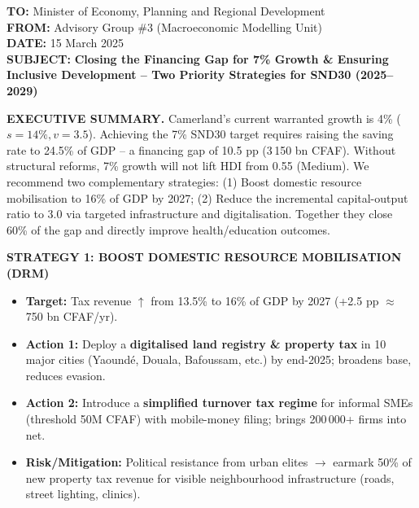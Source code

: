 \documentclass[11pt]{article}
\begin{document}
\begin{exemplebox}
\begin{center}
\end{center}

\vspace{0.5cm}
\noindent\textbf{TO:} Minister of Economy, Planning and Regional Development\\
\textbf{FROM:} Advisory Group \#3 (Macroeconomic Modelling Unit)\\
\textbf{DATE:} 15 March 2025\\
\textbf{SUBJECT:} \textbf{Closing the Financing Gap for 7\% Growth \& Ensuring Inclusive Development -- Two Priority Strategies for SND30 (2025--2029)}

\vspace{0.3cm}
\noindent\textbf{EXECUTIVE SUMMARY.} Camerland's current warranted growth is 4\% ($s=14\%, v=3.5$). Achieving the 7\% SND30 target requires raising the saving rate to 24.5\% of GDP -- a financing gap of 10.5 pp (3\,150 bn CFAF). Without structural reforms, 7\% growth will not lift HDI from 0.55 (Medium). We recommend two complementary strategies: (1) Boost domestic resource mobilisation to 16\% of GDP by 2027; (2) Reduce the incremental capital-output ratio to 3.0 via targeted infrastructure and digitalisation. Together they close 60\% of the gap and directly improve health/education outcomes.

\vspace{0.3cm}
\noindent\textbf{STRATEGY 1: BOOST DOMESTIC RESOURCE MOBILISATION (DRM)}
\begin{itemize}
    \item \textbf{Target:} Tax revenue $\uparrow$ from 13.5\% to 16\% of GDP by 2027 (+2.5 pp $\approx$ 750 bn CFAF/yr).
    \item \textbf{Action 1:} Deploy a \textbf{digitalised land registry \& property tax} in 10 major cities (Yaoundé, Douala, Bafoussam, etc.) by end-2025; broadens base, reduces evasion.
    \item \textbf{Action 2:} Introduce a \textbf{simplified turnover tax regime} for informal SMEs (threshold 50M CFAF) with mobile-money filing; brings 200\,000+ firms into net.
    \item \textbf{Risk/Mitigation:} Political resistance from urban elites $\rightarrow$ earmark 50\% of new property tax revenue for visible neighbourhood infrastructure (roads, street lighting, clinics).
\end{itemize}


\end{exemplebox}
\end{document}
